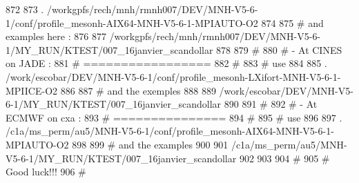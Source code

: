  872 
 873 . /workgpfs/rech/mnh/rmnh007/DEV/MNH-V5-6-1/conf/profile_mesonh-AIX64-MNH-V5-6-1-MPIAUTO-O2
 874 
 875 # and examples here :
 876 
 877 /workgpfs/rech/mnh/rmnh007/DEV/MNH-V5-6-1/MY_RUN/KTEST/007_16janvier_scandollar
 878 
 879 # 
 880 #  - At CINES on JADE :
 881 #    =================
 882 #
 883 # use 
 884 
 885 . /work/escobar/DEV/MNH-V5-6-1/conf/profile_mesonh-LXifort-MNH-V5-6-1-MPIICE-O2
 886 
 887 # and the exemples
 888 
 889 /work/escobar/DEV/MNH-V5-6-1/MY_RUN/KTEST/007_16janvier_scandollar
 890 
 891 #
 892 #  - At ECMWF on cxa :
 893 #    ===============
 894 #
 895 # use
 896 
 897 . /c1a/ms_perm/au5/MNH-V5-6-1/conf/profile_mesonh-AIX64-MNH-V5-6-1-MPIAUTO-O2
 898 
 899 # and the examples
 900 
 901 /c1a/ms_perm/au5/MNH-V5-6-1/MY_RUN/KTEST/007_16janvier_scandollar
 902 
 903 
 904 #
 905 #  Good luck!!!
 906 #